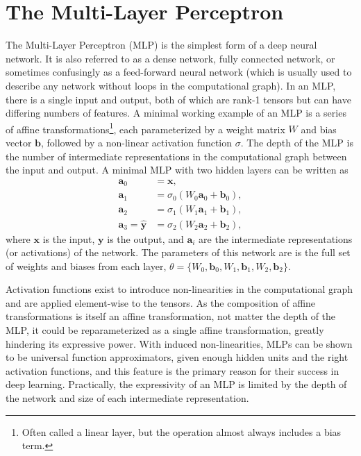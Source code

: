 \section{The Multi-Layer Perceptron}

The Multi-Layer Perceptron (MLP) is the simplest form of a deep neural network.
It is also referred to as a dense network, fully connected network, or sometimes confusingly as a feed-forward neural network (which is usually used to describe any network without loops in the computational graph).
In an MLP, there is a single input and output, both of which are rank-1 tensors but can have differing numbers of features.
A minimal working example of an MLP is a series of affine transformations\footnote{Often called a linear layer, but the operation almost always includes a bias term.}, each parameterized by a weight matrix $W$ and bias vector $\mathbf{b}$, followed by a non-linear activation function $\sigma$.
The depth of the MLP is the number of intermediate representations in the computational graph between the input and output.
A minimal MLP with two hidden layers can be written as
\begin{align}
    \mathbf{a}_0 &= \mathbf{x}, \\
    \mathbf{a}_1 &= \sigma_0(W_0 \mathbf{a}_0 + \mathbf{b}_0), \\
    \mathbf{a}_2 &= \sigma_1(W_1 \mathbf{a}_1 + \mathbf{b}_1), \\
    \mathbf{a}_3 = \mathbf{\hat{y}} &= \sigma_2(W_2 \mathbf{a}_2 + \mathbf{b}_2),
\end{align}
where $\mathbf{x}$ is the input, $\mathbf{y}$ is the output, and $\mathbf{a}_i$ are the intermediate representations (or activations) of the network.
The parameters of this network are is the full set of weights and biases from each layer, $\theta = \{W_0, \mathbf{b}_0, W_1, \mathbf{b}_1, W_2, \mathbf{b}_2\}$.

Activation functions exist to introduce non-linearities in the computational graph and are applied element-wise to the tensors.
As the composition of affine transformations is itself an affine transformation, not matter the depth of the MLP, it could be reparameterized as a single affine transformation, greatly hindering its expressive power.
With induced non-linearities, MLPs can be shown to be universal function approximators, given enough hidden units and the right activation functions, and this feature is the primary reason for their success in deep learning.
Practically, the expressivity of an MLP is limited by the depth of the network and size of each intermediate representation.

